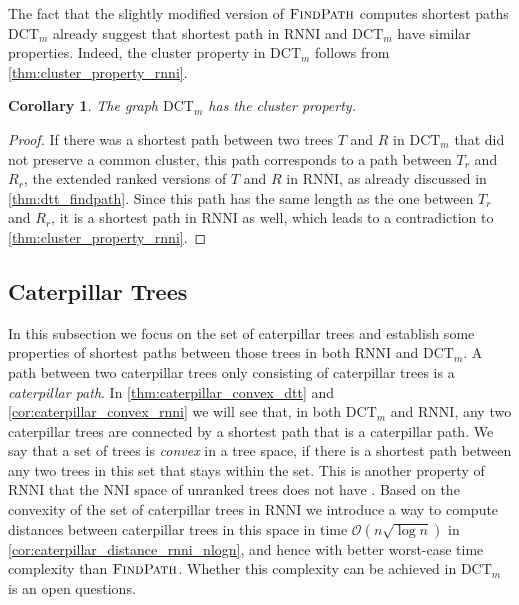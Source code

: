 \documentclass[11pt]{amsart}
\newtheorem{corollary}{Corollary}
\newcommand{\rnni}{\mathrm{RNNI}}
\newcommand{\findpath}{\textsc{FindPath}}
\newcommand{\nni}{\mathrm{NNI}}
\newcommand{\dtt}{\mathrm{DCT}}
\renewcommand{\O}{\mathcal O}
\newcommand{\summary}[1]{} %
\begin{document}
The fact that the slightly modified version of $\findpath$ computes shortest paths $\dtt_m$ already suggest that shortest path in $\rnni$ and $\dtt_m$ have similar properties.
Indeed, the cluster property in $\dtt_m$ follows from \autoref{thm:cluster_property_rnni}.

\begin{corollary}
	The graph $\dtt_m$ has the cluster property.
\end{corollary}

\begin{proof}
	If there was a shortest path between two trees $T$ and $R$ in $\dtt_m$ that did not preserve a common cluster, this path corresponds to a path between $T_r$ and $R_r$, the extended ranked versions of $T$ and $R$ in $\rnni$, as already discussed in \autoref{thm:dtt_findpath}.
	Since this path has the same length as the one between $T_r$ and $R_r$, it is a shortest path in $\rnni$ as well, which leads to a contradiction to \autoref{thm:cluster_property_rnni}.
\end{proof}

\subsection{Caterpillar Trees}
\label{section:caterpillar_convex}

\summary{Defining Caterpillar trees. Why are they interesting?}
In this subsection we focus on the set of caterpillar trees and establish some properties of shortest paths between those trees in both $\rnni$ and $\dtt_m$.
A path between two caterpillar trees only consisting of caterpillar trees is a \emph{caterpillar path}.
In \autoref{thm:caterpillar_convex_dtt} and \autoref{cor:caterpillar_convex_rnni} we will see that, in both $\dtt_m$ and $\rnni$, any two caterpillar trees are connected by a shortest path that is a caterpillar path.
We say that a set of trees is \emph{convex} in a tree space, if there is a shortest path between any two trees in this set that stays within the set.
This is another property of $\rnni$ that the $\nni$ space of unranked trees does not have \autocite{Gavryushkin2018-ol}.
Based on the convexity of the set of caterpillar trees in $\rnni$ we introduce a way to compute distances between caterpillar trees in this space in time $\O(n \sqrt{\log n})$ in \autoref{cor:caterpillar_distance_rnni_nlogn}, and hence with better worst-case time complexity than $\findpath$.
Whether this complexity can be achieved in $\dtt_m$ is an open questions.
\end{document}
